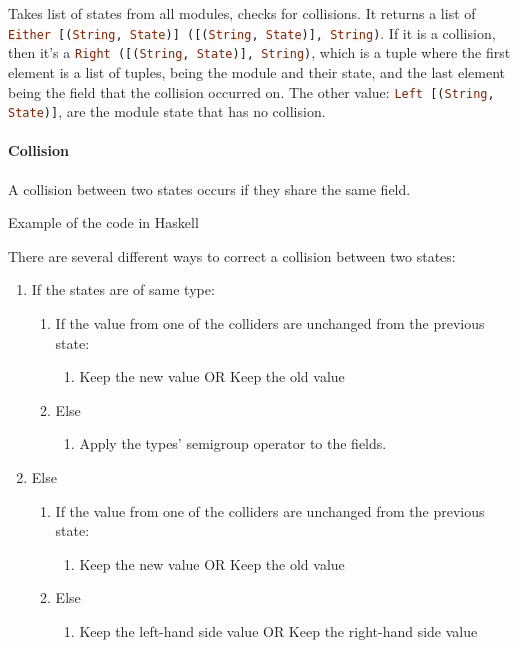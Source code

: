 Takes list of states from all modules, checks for collisions. It returns a
list of
\lstinline[language=Haskell]{Either [(String, State)] ([(String, State)], String)}.
If it is a collision, then it's a
\lstinline[language=Haskell]{Right ([(String, State)], String)}, which is a
tuple where the first element is a list of tuples, being the module and their
state, and the last element being the field that the collision occurred on.
The other value: \lstinline[language=Haskell]{Left [(String, State)]}, are the
module state that has no collision.

\paragraph{Collision} A collision between two states occurs if they share the same
field.

Example of the code in Haskell

\begin{center}
  
\end{center}

There are several different ways to correct a collision between two
states:

\begin{enumerate}
  \item If the states are of same type:
    \begin{enumerate}
      \item If the value from one of the colliders are unchanged from the previous state:
        \begin{enumerate}
          \item Keep the new value OR Keep the old value
        \end{enumerate}
      \item Else
        \begin{enumerate}
          \item Apply the types' semigroup operator to the fields.
        \end{enumerate}
    \end{enumerate}
  \item Else
    \begin{enumerate}
      \item If the value from one of the colliders are unchanged from the previous state:
        \begin{enumerate}
          \item Keep the new value OR Keep the old value
        \end{enumerate}
      \item Else
        \begin{enumerate}
          \item Keep the left-hand side value OR Keep the right-hand side value
        \end{enumerate}
    \end{enumerate}
\end{enumerate}

